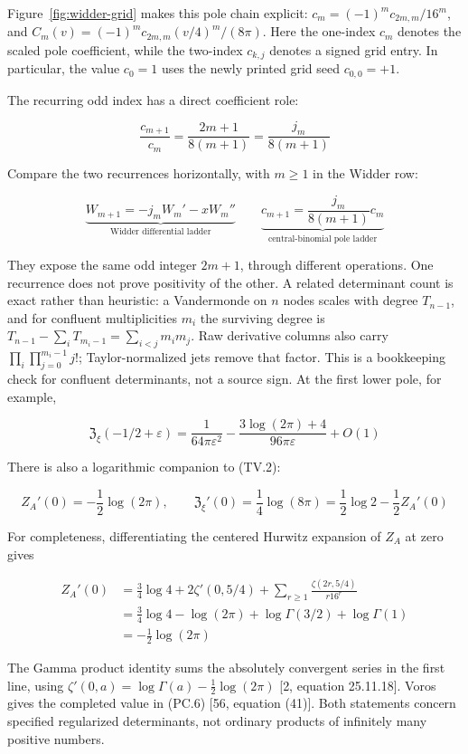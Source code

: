 \documentclass[
  11pt,
]{book}
\newcommand{\figref}[1]{Figure~\ref{#1}}
\begin{document}
\figref{fig:widder-grid} makes this pole chain explicit:
\(c_m=(-1)^m c_{2m,m}/16^m\), and
\(C_m(v)=(-1)^m c_{2m,m}(v/4)^m/(8\pi)\). Here the one-index \(c_m\)
denotes the scaled pole coefficient, while the two-index \(c_{k,j}\)
denotes a signed grid entry. In particular, the value \(c_0=1\) uses the
newly printed grid seed \(c_{0,0}=+1\).

The recurring odd index has a direct coefficient role:

\[
\boxed{\frac{c_{m+1}}{c_m}
=\frac{2m+1}{8(m+1)}=\frac{j_m}{8(m+1)}}
\tag{PC.3}
\]

Compare the two recurrences horizontally, with \(m\ge1\) in the Widder
row:

\[
\underbrace{W_{m+1}=-j_mW_m'-xW_m''}_{\text{Widder differential ladder}}
\qquad
\underbrace{c_{m+1}=\frac{j_m}{8(m+1)}c_m}_{\text{central-binomial pole ladder}}
\tag{PC.4}
\]

They expose the same odd integer \(2m+1\), through different operations.
One recurrence does not prove positivity of the other. A related
determinant count is exact rather than heuristic: a Vandermonde on \(n\)
nodes scales with degree \(T_{n-1}\), and for confluent multiplicities
\(m_i\) the surviving degree is
\(T_{n-1}-\sum_iT_{m_i-1}=\sum_{i<j}m_im_j\). Raw derivative columns
also carry \(\prod_i\prod_{j=0}^{m_i-1}j!\); Taylor-normalized jets
remove that factor. This is a bookkeeping check for confluent
determinants, not a source sign. At the first lower pole, for example,

\[
\mathfrak Z_\xi(-1/2+\varepsilon)
=\frac1{64\pi\varepsilon^2}
-\frac{3\log(2\pi)+4}{96\pi\varepsilon}+O(1)
\tag{PC.5}
\]

There is also a logarithmic companion to (TV.2):

\[
\boxed{Z_A'(0)=-\frac12\log(2\pi),\qquad
\mathfrak Z_\xi'(0)=\frac14\log(8\pi)
=\frac12\log2-\frac12Z_A'(0)}
\tag{PC.6}
\]

For completeness, differentiating the centered Hurwitz expansion of
\(Z_A\) at zero gives

\[
\begin{aligned}
Z_A'(0)
&=\frac34\log4+2\zeta'(0,5/4)
+\sum_{r\ge1}\frac{\zeta(2r,5/4)}{r16^r}\\
&=\frac34\log4-\log(2\pi)
+\log\Gamma(3/2)+\log\Gamma(1)\\
&=-\frac12\log(2\pi)
\end{aligned}
\tag{PC.7}
\]

The Gamma product identity sums the absolutely convergent series in the
first line, using \(\zeta'(0,a)=\log\Gamma(a)-\tfrac12\log(2\pi)\) {[}2,
equation 25.11.18{]}. Voros gives the completed value in (PC.6) {[}56,
equation (41){]}. Both statements concern specified regularized
determinants, not ordinary products of infinitely many positive numbers.
\end{document}
